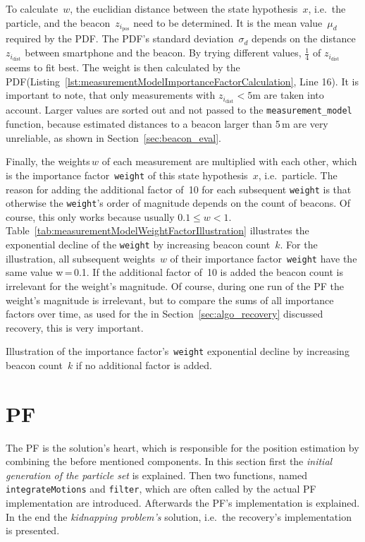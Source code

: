 

To calculate~$w$, the euclidian distance between the state hypothesis~$x$, i.e.\ the particle, and  the beacon~$z_{i_\text{pos}}$ need to be determined. It is the mean value~$\mu_d$ required by the \ac{PDF}. The \ac{PDF}'s standard deviation~$\sigma_d$ depends on the distance~$z_{i_\text{dist}}$ between smartphone and the beacon. By trying different values, $\frac{1}{4}$ of $z_{i_\text{dist}}$ seems to fit best. The weight is then calculated by the \ac{PDF}(Listing~\ref{lst:measurementModelImportanceFactorCalculation}, Line 16). It is important to note, that only measurements with $z_{i_\text{dist}} < 5\text{m}$ are taken into account. Larger values are sorted out and not passed to the \texttt{measurement\_model} function, because estimated distances to a beacon larger than 5\,m are very unreliable, as shown in Section~\ref{sec:beacon_eval}.

Finally, the weights\,$w$ of each measurement are multiplied with each other, which is the importance factor~\texttt{weight} of this state hypothesis~$x$, i.e.\ particle. The reason for adding the additional factor of~10 for each subsequent \texttt{weight} is that otherwise the \texttt{weight}'s order of magnitude depends on the count of beacons. Of course, this only works because usually $0.1 \leq w < 1$. Table~\ref{tab:measurementModelWeightFactorIllustration} illustrates the exponential decline of the \texttt{weight} by increasing beacon count~$k$. For the illustration, all subsequent weights~$w$ of their importance factor~\texttt{weight} have the same value w\,=\,0.1. If the additional factor of~10 is added the beacon count is irrelevant for the weight's magnitude. Of course, during one run of the \acl{PF} the weight's magnitude is irrelevant, but to compare the sums of all importance factors over time, as used for the in Section~\ref{sec:algo_recovery} discussed recovery, this is very important.

\begin{table}
	
	\caption{Illustration of the importance factor's~\texttt{weight} exponential decline by increasing beacon count~$k$ if no additional factor is added.}
	\label{tab:measurementModelWeightFactorIllustration}
\end{table}


\section{\acl{PF}}\label{sec:algo_pf}
The \acl{PF} is the solution's heart, which is responsible for the position estimation by combining the before mentioned components. In this section first the \emph{initial generation of the particle set} is explained. Then two functions, named \texttt{integrateMotions} and \texttt{filter}, which are often called by the actual \ac{PF} implementation are introduced. Afterwards the \ac{PF}'s implementation is explained. In the end the \emph{kidnapping problem's} solution, i.e.\ the recovery's implementation is presented.


